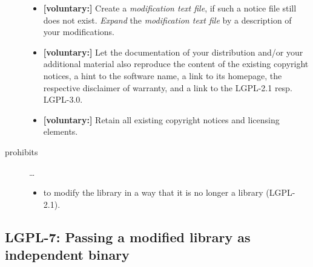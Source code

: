 \begin{description}
\begin{itemize}
  \item \textbf{[voluntary:]} Create a \emph{modification text file}, if such a
  notice file still does not exist. \emph{Expand} the \emph{modification text
  file} by a description of your modifications.
  
  \item \textbf{[voluntary:]} Let the documentation of your distribution and/or
  your additional material also reproduce the content of the existing
  copyright notices, a hint to the software name, a link to its homepage,
  the respective disclaimer of warranty, and a link to the LGPL-2.1 resp.
  LGPL-3.0.
  
  \item \textbf{[voluntary:]} Retain all existing copyright notices and
  licensing elements. 

\end{itemize}

\item[prohibits] \ldots
\begin{itemize}
  \item to modify the library in a way that it is no longer a library
  (LGPL-2.1).
\end{itemize}

\end{description}


\subsection{LGPL-7: Passing a modified library as independent binary}
\label{OSUC-08B-LGPL}

